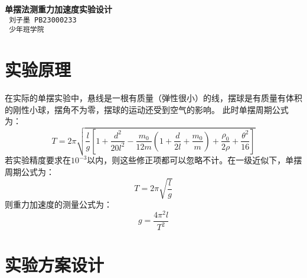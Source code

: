 \documentclass[a4paper]{extarticle}
\begin{document}
    \begin{center}
        \textbf{\fontsize{22pt}{\baselineskip} \selectfont 单摆法测重力加速度实验设计}\\
        \vspace{2em}
        \texttt{\fontsize{14pt}{\baselineskip} \selectfont 刘子墨 PB23000233}\\
        \texttt{\fontsize{14pt}{\baselineskip} \selectfont 少年班学院}\\
    \end{center}
    \section{实验原理}
    \hspace{2em}
    在实际的单摆实验中，悬线是一根有质量（弹性很小）的线，摆球是有质量有体积的刚性小球，摆角不为零，摆球的运动还受到空气的影响。
    此时单摆周期公式为：\\
    \begin{equation*}
        T=2\pi\sqrt{\frac{l}{g}\left[1+\frac{d^2}{20l^2}-\frac{m_0}{12m}\left(1+\frac{d}{2l}+\frac{m_0}{m}\right)+\frac{\rho_0}{2\rho}+\frac{\theta^2}{16}\right]}
    \end{equation*}
    若实验精度要求在$10^{-3}$以内，则这些修正项都可以忽略不计。在一级近似下，单摆周期公式为：\\
    \begin{equation*}
        T=2\pi\sqrt{\frac{l}{g}}
    \end{equation*}
    则重力加速度的测量公式为：\\
    \begin{equation*}
        g=\frac{4\pi^2l}{T^2}
    \end{equation*}
    \section{实验方案设计}
\end{document}
